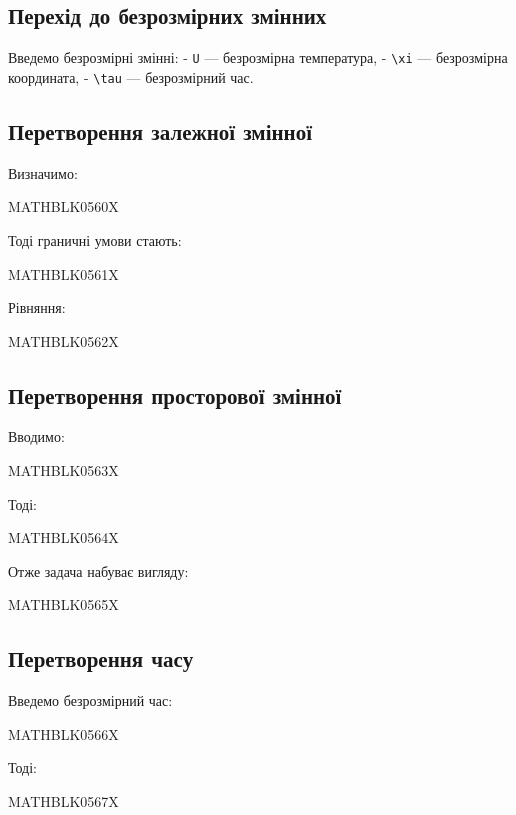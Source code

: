 \documentclass[
  ukrainian,
]{article}
\begin{document}
\subsection{Перехід до безрозмірних
змінних}\label{ux43fux435ux440ux435ux445ux456ux434-ux434ux43e-ux431ux435ux437ux440ux43eux437ux43cux456ux440ux43dux438ux445-ux437ux43cux456ux43dux43dux438ux445}

Введемо безрозмірні змінні: - \texttt{U} --- безрозмірна температура, -
\texttt{\textbackslash{}xi} --- безрозмірна координата, -
\texttt{\textbackslash{}tau} --- безрозмірний час.

\subsection{Перетворення залежної
змінної}\label{ux43fux435ux440ux435ux442ux432ux43eux440ux435ux43dux43dux44f-ux437ux430ux43bux435ux436ux43dux43eux457-ux437ux43cux456ux43dux43dux43eux457}

Визначимо:

MATHBLK0560X

Тоді граничні умови стають:

MATHBLK0561X

Рівняння:

MATHBLK0562X

\subsection{Перетворення просторової
змінної}\label{ux43fux435ux440ux435ux442ux432ux43eux440ux435ux43dux43dux44f-ux43fux440ux43eux441ux442ux43eux440ux43eux432ux43eux457-ux437ux43cux456ux43dux43dux43eux457}

Вводимо:

MATHBLK0563X

Тоді:

MATHBLK0564X

Отже задача набуває вигляду:

MATHBLK0565X

\subsection{Перетворення
часу}\label{ux43fux435ux440ux435ux442ux432ux43eux440ux435ux43dux43dux44f-ux447ux430ux441ux443}

Введемо безрозмірний час:

MATHBLK0566X

Тоді:

MATHBLK0567X
\end{document}
